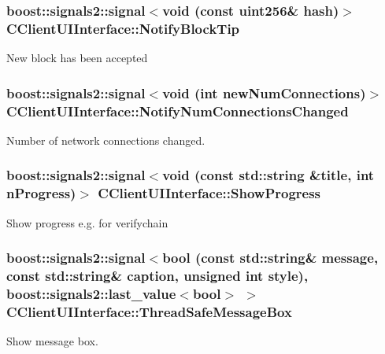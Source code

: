 \subsubsection[{Notify\+Block\+Tip}]{\setlength{\rightskip}{0pt plus 5cm}boost\+::signals2\+::signal$<$void (const {\bf uint256}\& hash)$>$ C\+Client\+U\+I\+Interface\+::\+Notify\+Block\+Tip}\label{class_c_client_u_i_interface_a4bfd5841b9471733b40568ca21eaf010}
New block has been accepted \hypertarget{class_c_client_u_i_interface_a496995d44db8dc3e3ef84d345e25967d}{}
\subsubsection[{Notify\+Num\+Connections\+Changed}]{\setlength{\rightskip}{0pt plus 5cm}boost\+::signals2\+::signal$<$void (int new\+Num\+Connections)$>$ C\+Client\+U\+I\+Interface\+::\+Notify\+Num\+Connections\+Changed}\label{class_c_client_u_i_interface_a496995d44db8dc3e3ef84d345e25967d}
Number of network connections changed. \hypertarget{class_c_client_u_i_interface_a64e516e507dd74f3639c51dffa645af2}{}
\subsubsection[{Show\+Progress}]{\setlength{\rightskip}{0pt plus 5cm}boost\+::signals2\+::signal$<$void (const std\+::string \&title, int n\+Progress)$>$ C\+Client\+U\+I\+Interface\+::\+Show\+Progress}\label{class_c_client_u_i_interface_a64e516e507dd74f3639c51dffa645af2}
Show progress e.\+g. for verifychain \hypertarget{class_c_client_u_i_interface_a9d328cc06777490e90e8c6a9cb31335f}{}
\subsubsection[{Thread\+Safe\+Message\+Box}]{\setlength{\rightskip}{0pt plus 5cm}boost\+::signals2\+::signal$<$bool (const std\+::string\& message, const std\+::string\& caption, unsigned int style), boost\+::signals2\+::last\+\_\+value$<$bool$>$ $>$ C\+Client\+U\+I\+Interface\+::\+Thread\+Safe\+Message\+Box}\label{class_c_client_u_i_interface_a9d328cc06777490e90e8c6a9cb31335f}
Show message box. \hypertarget{class_c_client_u_i_interface_a996160f65965769cf7fc50e6fd17dc9a}{}
